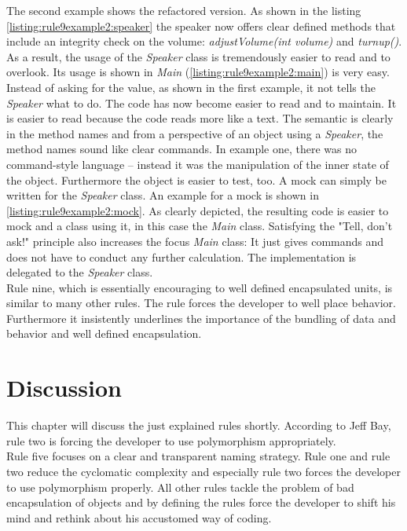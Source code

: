 The second example shows the refactored version. As shown in the listing \ref{listing:rule9example2:speaker} the speaker now offers clear defined methods that include an integrity check on the volume: \textit{adjustVolume(int volume)} and \textit{turnup()}. As a result, the usage of the \textit{Speaker} class is tremendously easier to read and to overlook. Its usage is shown in \textit{Main} (\ref{listing:rule9example2:main}) is very easy. 
\\

Instead of asking for the value, as shown in the first example, it not tells the \textit{Speaker} what to do. The code has now become easier to read and to maintain. It is easier to read because the code reads more like a text. The semantic is clearly in the method names and from a perspective of an object using a \textit{Speaker}, the method names sound like clear commands. In example one, there was no command-style language -- instead it was the manipulation of the inner state of the object. Furthermore the object is easier to test, too. A mock can simply be written for the \textit{Speaker} class. An example for a mock is shown in \ref{listing:rule9example2:mock}. As clearly depicted, the resulting code is easier to mock and a class using it, in this case the \textit{Main} class. Satisfying the "Tell, don't ask!"\cite{telldontaskoriginal} principle also increases the focus \textit{Main} class: It just gives commands and does not have to conduct any further calculation. The implementation is delegated to the \textit{Speaker} class. 
\\

Rule nine, which is essentially encouraging to well defined encapsulated units, is similar to many other rules. The rule forces the developer to well place behavior. Furthermore it insistently underlines the importance of the bundling of data and behavior and well defined encapsulation. 

\section{Discussion}
\label{d:discussion}
This chapter will discuss the just explained rules shortly. According to Jeff Bay, rule two is forcing the developer to use polymorphism appropriately. 
\\

Rule five focuses on a clear and transparent naming strategy. Rule one and rule two reduce the cyclomatic complexity and especially rule two forces the developer to use polymorphism properly. All other rules tackle the problem of bad encapsulation of objects and by defining the rules force the developer to shift his mind and rethink about his accustomed way of coding. 
\\

